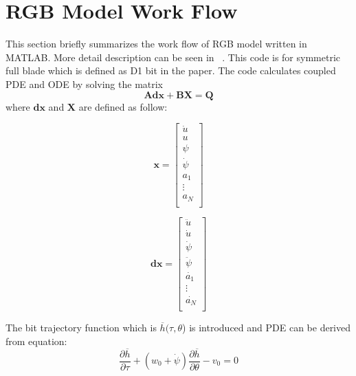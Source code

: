 \chapter{RGB Model Work Flow}
\label{ap:rgbworkflow}
This section briefly summarizes the work flow of RGB model written in MATLAB. More detail description can be seen in ~\cite{ref:zhang2020a}.  This code is for symmetric full blade which is defined as D1 bit in the paper.  The code calculates coupled PDE and ODE by solving the matrix
\begin{equation}\label{matrix}
  \bm{Adx} + \bm{BX} = \bm{Q}
\end{equation}
where $\bm{dx}$ and $\bm{X}$ are defined as follow:
\vspace{\abovedisplayskip}

\noindent\begin{minipage}{.4\linewidth}
\begin{equation}
\bm{x}=
\begin{bmatrix}
\dot{u} \\
u \\
\psi \\
\dot{\psi} \\
a_1\ \\
\vdots \\
a_N \\
\end{bmatrix}
\end{equation}
\end{minipage}%
\hfill
\begin{minipage}{.4\linewidth}
\begin{equation}
\bm{dx}=
\begin{bmatrix}
\ddot{u} \\
\dot{u} \\
\dot{\psi} \\
\ddot{\psi} \\
\dot{a_1}\ \\
\vdots \\
\dot{a_N} \\
\end{bmatrix}
\end{equation}
\end{minipage}
\vspace{\belowdisplayskip}

The bit trajectory function which is $\overline{h}(\tau, \theta$) is introduced and PDE can be derived from equation:
\begin{equation}\label{PDE}
\frac{\partial \overline{h}}{\partial \tau} + (w_0 + \dot{\psi})\frac{\partial \overline{h}}{\partial \theta}-v_0 = 0
\end{equation}

